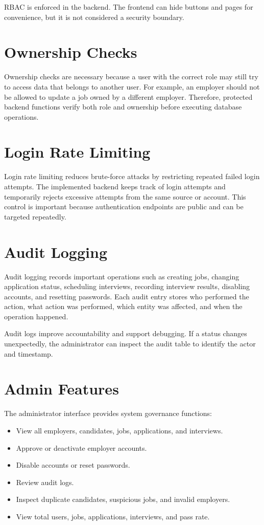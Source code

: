 \documentclass[12pt,a4paper]{report}
\begin{document}
RBAC is enforced in the backend. The frontend can hide buttons and pages for convenience, but it is not considered a security boundary.

\section{Ownership Checks}

Ownership checks are necessary because a user with the correct role may still try to access data that belongs to another user. For example, an employer should not be allowed to update a job owned by a different employer. Therefore, protected backend functions verify both role and ownership before executing database operations.

\section{Login Rate Limiting}

Login rate limiting reduces brute-force attacks by restricting repeated failed login attempts. The implemented backend keeps track of login attempts and temporarily rejects excessive attempts from the same source or account. This control is important because authentication endpoints are public and can be targeted repeatedly.

\section{Audit Logging}

Audit logging records important operations such as creating jobs, changing application status, scheduling interviews, recording interview results, disabling accounts, and resetting passwords. Each audit entry stores who performed the action, what action was performed, which entity was affected, and when the operation happened.

Audit logs improve accountability and support debugging. If a status changes unexpectedly, the administrator can inspect the audit table to identify the actor and timestamp.

\section{Admin Features}

The administrator interface provides system governance functions:

\begin{itemize}[leftmargin=1.5cm]
  \item View all employers, candidates, jobs, applications, and interviews.
  \item Approve or deactivate employer accounts.
  \item Disable accounts or reset passwords.
  \item Review audit logs.
  \item Inspect duplicate candidates, suspicious jobs, and invalid employers.
  \item View total users, jobs, applications, interviews, and pass rate.
\end{itemize}
\end{document}
